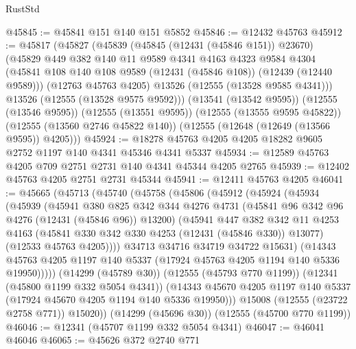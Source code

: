 \begin{lexlean}{RustStd}
\begin{coremodule}
@45845 := @45841 @151 @140 @151 @5852
@45846 := @12432 @45763
@45912 := @45817
    (@45827
      (@45839
        (@45845 (@12431 (@45846 @151)) @23670)
        (@45829
          @449
          @382
          @140
          @11
          @9589
          @4341
          @4163
          @4323
          @9584
          @4304
          (@45841 @108 @140 @108 @9589 (@12431 (@45846 @108)) (@12439 (@12440 @9589)))
          (@12763 @45763 @4205)
          @13526
          (@12555 (@13528 @9585 @4341)))
        @13526
        (@12555 (@13528 @9575 @9592)))
      (@13541 (@13542 @9595))
      (@12555 (@13546 @9595))
      (@12555 (@13551 @9595))
      (@12555 (@13555 @9595 @45822))
      (@12555 (@13560 @2746 @45822 @140))
      (@12555 (@12648 (@12649 (@13566 @9595)) @4205)))
@45924 := @18278 @45763 @4205 @4205 @18282 @9605 @2752 @1197 @140 @4341 @45346 @4341 @5337
@45934 := @12589 @45763 @4205 @709 @2751 @2731 @140 @4341 @45344 @4205 @2765
@45939 := @12402 @45763 @4205 @2751 @2731 @45344
@45941 := @12411 @45763 @4205
@46041 := @45665
    (@45713
      (@45740
        (@45758
          (@45806
            (@45912
              (@45924
                (@45934
                  (@45939
                    (@45941
                      @380
                      @825
                      @342
                      @344
                      @4276
                      @4731
                      (@45841 @96 @342 @96 @4276 (@12431 (@45846 @96)) @13200)
                      (@45941
                        @447
                        @382
                        @342
                        @11
                        @4253
                        @4163
                        (@45841 @330 @342 @330 @4253 (@12431 (@45846 @330)) @13077)
                        (@12533 @45763 @4205))))
                  @34713
                  @34716
                  @34719
                  @34722
                  @15631)
                (@14343
                  @45763
                  @4205
                  @1197
                  @140
                  @5337
                  (@17924 @45763 @4205 @1194 @140 @5336 @19950)))))
          (@14299 (@45789 @30))
          (@12555 (@45793 @770 @1199))
          (@12341 (@45800 @1199 @332 @5054 @4341))
          (@14343 @45670 @4205 @1197 @140 @5337 (@17924 @45670 @4205 @1194 @140 @5336 @19950)))
        @15008
        (@12555 (@23722 @2758 @771))
        @15020))
    (@14299 (@45696 @30))
    (@12555 (@45700 @770 @1199))
@46046 := @12341 (@45707 @1199 @332 @5054 @4341)
@46047 := @46041 @46046
@46065 := @45626
    @372
    @2740
    @771

\end{coremodule}
\end{lexlean}

